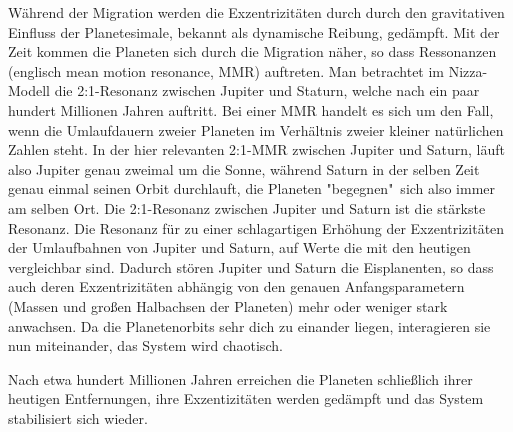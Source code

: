 \documentclass[10pt,a4paper,twoside]{article}
\begin{document}
Während der Migration werden die Exzentrizitäten durch durch den gravitativen Einfluss der Planetesimale, bekannt als dynamische Reibung, gedämpft.\cite{Tsiganis2005}
Mit der Zeit kommen die Planeten sich durch die Migration näher, so dass Ressonanzen (englisch mean motion resonance, MMR) auftreten.
Man betrachtet im Nizza-Modell die 2:1-Resonanz zwischen Jupiter und Staturn, welche nach ein paar hundert Millionen Jahren auftritt.
Bei einer MMR handelt es sich um den Fall, wenn die Umlaufdauern zweier Planeten im Verhältnis zweier kleiner natürlichen Zahlen steht. In der hier relevanten 2:1-MMR zwischen Jupiter und Saturn, läuft also Jupiter genau zweimal um die Sonne, während Saturn in der selben Zeit genau einmal seinen Orbit durchlauft, die Planeten "begegnen"\ sich also immer am selben Ort. %
Die 2:1-Resonanz zwischen Jupiter und Saturn ist die stärkste Resonanz. %
Die Resonanz für zu einer schlagartigen Erhöhung der Exzentrizitäten der Umlaufbahnen von Jupiter und Saturn, auf Werte die mit den heutigen vergleichbar sind. %
Dadurch stören Jupiter und Saturn die Eisplanenten, so dass auch deren Exzentrizitäten abhängig von den genauen Anfangsparametern (Massen und großen Halbachsen der Planeten) mehr oder weniger stark anwachsen\cite{Tsiganis2005}.
Da die Planetenorbits sehr dich zu einander liegen, interagieren  sie nun miteinander\cite{Tsiganis2005}, das System wird chaotisch. 

Nach etwa hundert Millionen Jahren erreichen die Planeten schließlich ihrer heutigen Entfernungen, ihre Exzentizitäten werden gedämpft und das System stabilisiert sich wieder.
\end{document}
